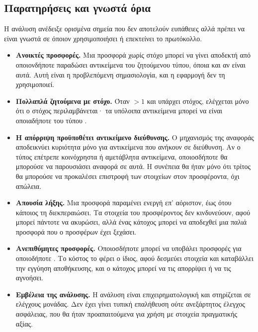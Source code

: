 \subsection{Παρατηρήσεις και γνωστά όρια}
\label{sec:security-limits}

Η ανάλυση ανέδειξε ορισμένα σημεία που δεν αποτελούν ευπάθειες αλλά πρέπει να είναι γνωστά
σε όποιον χρησιμοποιήσει ή επεκτείνει το πρωτόκολλο.

\begin{itemize}[nosep]
  \item \textbf{Ανοικτές προσφορές.} Μια προσφορά χωρίς στόχο μπορεί να γίνει αποδεκτή από
        οποιονδήποτε παραδώσει αντικείμενα του ζητούμενου τύπου, όποια και αν είναι αυτά.
        Αυτή είναι η προβλεπόμενη σημασιολογία, και η εφαρμογή δεν τη χρησιμοποιεί.
  \item \textbf{Πολλαπλά ζητούμενα με στόχο.} Όταν  $> 1$ και
        υπάρχει στόχος, ελέγχεται μόνο ότι ο στόχος περιλαμβάνεται· τα υπόλοιπα
        αντικείμενα μπορεί να είναι οποιαδήποτε του τύπου .
  \item \textbf{Η απόρριψη προϋποθέτει αντικείμενο διεύθυνσης.} Ο μηχανισμός της αναφοράς
        αποδεικνύει κυριότητα μόνο για αντικείμενα που ανήκουν σε διεύθυνση. Αν ο τύπος
         επέτρεπε κοινόχρηστα ή αμετάβλητα αντικείμενα, οποιοσδήποτε θα μπορούσε
        να παρουσιάσει αναφορά σε αυτά. Η συνέπεια θα ήταν μόνο ότι τρίτος θα μπορούσε να
        προκαλέσει επιστροφή των στοιχείων στον προσφέροντα, όχι απώλεια.
  \item \textbf{Απουσία λήξης.} Μια προσφορά παραμένει ενεργή επ' αόριστον, έως ότου
        κάποιος τη διεκπεραιώσει. Τα στοιχεία του προσφέροντος δεν κινδυνεύουν, αφού μπορεί
        πάντοτε να ακυρώσει, αλλά ένας κάτοχος μπορεί να αποδεχθεί μια παλιά προσφορά που
        ο προσφέρων έχει ξεχάσει.
  \item \textbf{Ανεπιθύμητες προσφορές.} Οποιοσδήποτε μπορεί να υποβάλει προσφορές για
        οποιοδήποτε . Το κόστος το φέρει ο ίδιος, αφού δεσμεύει στοιχεία και
        καταβάλλει την εγγύηση αποθήκευσης, και ο κάτοχος μπορεί να τις απορρίψει ή να τις
        αγνοήσει.
  \item \textbf{Εμβέλεια της ανάλυσης.} Η ανάλυση είναι επιχειρηματολογική και στηρίζεται
        σε ελέγχους μονάδας. Δεν έχει γίνει τυπική επαλήθευση ούτε ανεξάρτητος έλεγχος
        ασφάλειας, που θα ήταν προαπαιτούμενα για χρήση με στοιχεία πραγματικής αξίας.
\end{itemize}

